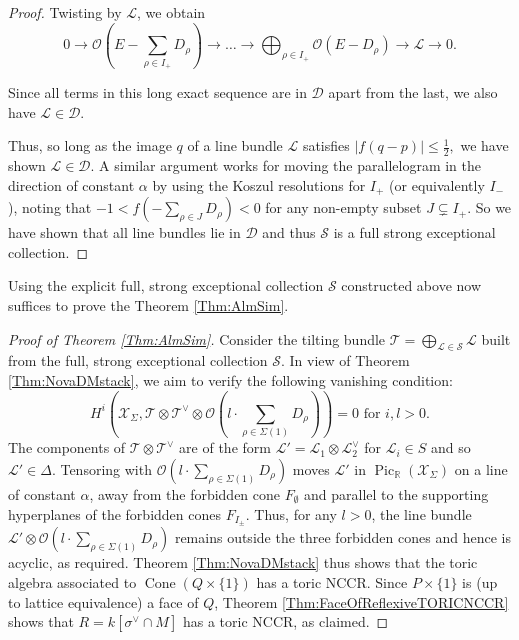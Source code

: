 \documentclass[reqno, 12pt]{amsart}
\theoremstyle{definition}
\numberwithin{equation}{section}
\newcommand{\R}{\mathbb{R}}
\def\O{\mathcal{O}}
\newcommand{\cone}{\operatorname{Cone}}
\begin{document}
\begin{proof}
Twisting by $\mathcal{L}$, we obtain\[
0\rightarrow \O(E-\sum_{\rho\in I_+}D_\rho)\rightarrow \dots\rightarrow \bigoplus_{\rho\in I_+}\O(E- D_\rho)\rightarrow \mathcal{L}\rightarrow 0.
\]

\noindent Since all terms in this long exact sequence are in $\mathcal{D}$ apart from the last, we also have $\mathcal{L}\in\mathcal{D}$.

Thus, so long as the image $q$ of a line bundle $\mathcal{L}$ satisfies $|f(q-p)|\le \frac{1}{2},$ we have shown $\mathcal{L}\in\mathcal{D}$. A similar argument works for moving the parallelogram in the direction of constant $\alpha$ by using the Koszul resolutions for $I_+$ (or equivalently $I_-$), noting that $-1<f(-\sum_{\rho\in J}D_\rho)<0$ for any non-empty subset $J\subsetneq I_+$. So we have shown that all line bundles lie in $\mathcal{D}$ and thus $\mathcal{S}$ is a full strong exceptional collection.
\end{proof}

Using the explicit full, strong exceptional collection $\mathcal{S}$ constructed above now suffices to prove the Theorem \ref{Thm:AlmSim}.

\begin{proof}[Proof of Theorem \ref{Thm:AlmSim}]
Consider the tilting bundle $\mathcal{T}=\bigoplus_{\mathcal{L}\in \mathcal{S}}\mathcal{L}$ built from the full, strong exceptional collection $\mathcal{S}$. In view of Theorem \ref{Thm:NovaDMstack}, we aim to verify the following vanishing condition:\[
H^i\left(\mathcal{X}_\Sigma, \mathcal{T}\otimes \mathcal{T}^\vee\otimes \O\left(l\cdot\sum_{\rho\in\Sigma(1)}D_\rho\right)\right)=0\text{ for }i,l>0.
\]
The components of $\mathcal{T}\otimes\mathcal{T}^\vee$ are of the form $\mathcal{L}'=\mathcal{L}_1\otimes\mathcal{L}_2^\vee$ for $\mathcal{L}_i\in S$ and so $\mathcal{L}'\in\Delta$. Tensoring with $\O\left(l\cdot\sum_{\rho\in \Sigma(1)}D_\rho\right)$ moves $\mathcal{L}'$ in $\operatorname{Pic}_\R(\mathcal{X}_\Sigma)$ on a line of constant $\alpha$, away from the forbidden cone $F_\emptyset$ and parallel to the supporting hyperplanes of the forbidden cones $F_{I_\pm}$. Thus, for any $l>0$, the line bundle $\mathcal{L}'\otimes \O\left(l\cdot\sum_{\rho\in \Sigma(1)}D_\rho\right)$ remains outside the three forbidden cones and hence is acyclic, as required. Theorem \ref{Thm:NovaDMstack} thus shows that the toric algebra associated to $\cone(Q\times\{1\})$ has a toric NCCR. Since $P\times\{1\}$ is (up to lattice equivalence) a face of $Q$, Theorem \ref{Thm:FaceOfReflexiveTORICNCCR} shows that $R=k[\sigma^\vee\cap M]$ has a toric NCCR, as claimed.
\end{proof}
\end{document}
